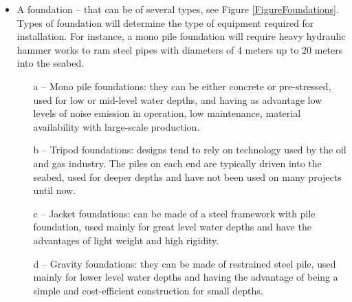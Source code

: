 \begin{itemize}
\item A foundation -- that can be of several types, see Figure \ref{FigureFoundations}. Types of foundation will determine the type of equipment required for installation. For instance, a mono pile foundation will require heavy hydraulic hammer works to ram steel pipes with diameters of 4 meters up to 20 meters into the seabed.

\begin{enumerate}
\item[a] -- Mono pile foundations: they can be either concrete or pre-stressed, used for low or mid-level water depths, and having as advantage low levels of noise emission in operation, low maintenance, material availability with large-scale production.
\item[b] -- Tripod foundations: designs tend to rely on technology used by the oil and gas industry. The piles on each end are typically driven into the seabed, used for deeper depths and have not been used on many projects until now.
\item[c] -- Jacket foundations: can be made of a steel framework with pile foundation, used mainly for great level water depths and have the advantages of light weight and high rigidity.
\item[d] -- Gravity foundations: they can be made of restrained steel pile, used mainly for lower level water depths and having the advantage of being a simple and cost-efficient construction for small depths. 
\end{enumerate}


\end{itemize}
